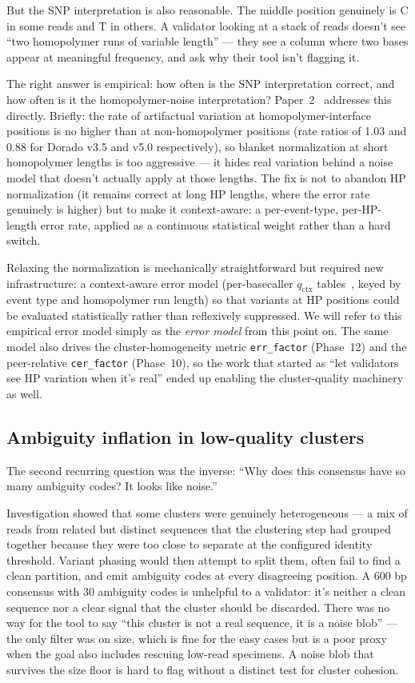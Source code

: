 \documentclass[11pt]{article}
\begin{document}
But the SNP interpretation is also reasonable. The middle position genuinely
is C in some reads and T in others. A validator looking at a stack of reads
doesn't see ``two homopolymer runs of variable length'' --- they see a column
where two bases appear at meaningful frequency, and ask why their tool isn't
flagging it.

The right answer is empirical: how often is the SNP interpretation correct,
and how often is it the homopolymer-noise interpretation?
Paper~2~\cite{hp_paper} addresses this directly. Briefly: the rate of
artifactual variation at homopolymer-interface positions is no higher than at
non-homopolymer positions (rate ratios of 1.03 and 0.88 for Dorado v3.5 and
v5.0 respectively), so blanket normalization at short homopolymer lengths is
too aggressive --- it hides real variation behind a noise model that doesn't
actually apply at those lengths. The fix is not to abandon HP normalization
(it remains correct at long HP lengths, where the error rate genuinely is
higher) but to make it context-aware: a per-event-type, per-HP-length error
rate, applied as a continuous statistical weight rather than a hard switch.

Relaxing the normalization is mechanically straightforward but required new
infrastructure: a context-aware error model (per-basecaller $q_\text{ctx}$
tables~\cite{hp_paper}, keyed by event type and homopolymer run length) so
that variants at HP positions could be evaluated statistically rather than
reflexively suppressed. We will refer to this empirical error model simply
as the \emph{error model} from this point on. The same model also drives
the cluster-homogeneity metric \texttt{err\_factor} (Phase~12) and the
peer-relative \texttt{cer\_factor} (Phase~10), so the work that started as
``let validators see HP variation when it's real'' ended up enabling the
cluster-quality machinery as well.

\subsection{Ambiguity inflation in low-quality clusters}
\label{sec:ambiguity-inflation}

The second recurring question was the inverse: ``Why does this consensus have
so many ambiguity codes? It looks like noise.''

Investigation showed that some clusters were genuinely heterogeneous --- a mix
of reads from related but distinct sequences that the clustering step had
grouped together because they were too close to separate at the configured
identity threshold. Variant phasing would then attempt to split them, often
fail to find a clean partition, and emit ambiguity codes at every disagreeing
position. A 600 bp consensus with 30 ambiguity codes is unhelpful to a
validator: it's neither a clean sequence nor a clear signal that the cluster
should be discarded. There was no way for the tool to say ``this cluster is
not a real sequence, it is a noise blob'' --- the only filter was on size,
which is fine for the easy cases but is a poor proxy when the goal also
includes rescuing low-read specimens. A noise blob that survives the size
floor is hard to flag without a distinct test for cluster cohesion.
\end{document}
